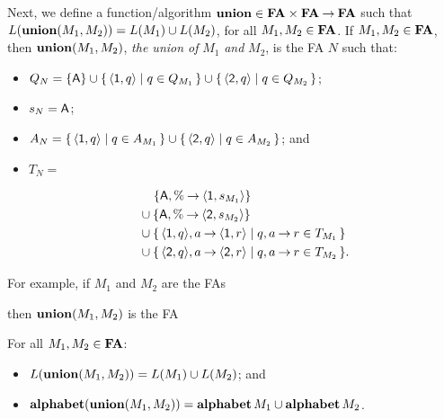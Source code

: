%
%
%
Next, we define a function/algorithm $\mathbf{union}\in\mathbf{FA}\times\mathbf{FA}\mathbin{\to}\mathbf{FA}$
such that $L(\mathbf{union}(M_1,M_2))=L(M_1)\cup L(M_2)$, for all
$M_1,M_2\in\mathbf{FA}$.  If $M_1,M_2\in\mathbf{FA}$, then $\mathbf{union}(M_1,M_2)$,
\emph{the union of} $M_1$ \emph{and} $M_2$, is the FA $N$ such that:
\begin{itemize}
\item $Q_N= \{\mathsf{A}\}\cup\{ \, \langle\mathsf{1},q\rangle \mid q\in
    Q_{M_1} \, \}\cup \{ \, \langle\mathsf{2},q\rangle \mid q\in Q_{M_2} \, \}$;

\item $s_N=\mathsf{A}$;

\item $A_N=\{ \, \langle\mathsf{1},q\rangle \mid q\in A_{M_1} \, \}\cup
  \{ \, \langle\mathsf{2},q\rangle \mid q\in A_{M_2} \, \}$; and

\item $T_N={}$

\begin{align*}
  &\quad
  \,\{\mathsf{A},\%\mathbin{\to} \langle\mathsf{1},s_{M_1}\rangle\} \\
  &\cup \{\mathsf{A},\%\mathbin{\to}\langle\mathsf{2},s_{M_2}\rangle\} \\
  &\cup \{ \, \langle\mathsf{1},q\rangle,a\mathbin{\to}\langle\mathsf{1},r\rangle \mid q,
    a\mathbin{\to} r\in T_{M_1} \, \}
  \\
  &\cup \{ \, \langle\mathsf{2},q\rangle,a\mathbin{\to}\langle\mathsf{2},r\rangle \mid q,
    a\mathbin{\to} r \in T_{M_2} \, \}.
\end{align*}
\end{itemize}

For example, if $M_1$ and $M_2$ are the FAs
\begin{center}


\end{center}
then $\mathbf{union}(M_1,M_2)$ is the FA
\begin{center}

\end{center}

\begin{proposition}
For all $M_1,M_2\in\mathbf{FA}$:
\begin{itemize}
\item $L(\mathbf{union}(M_1,M_2))=L(M_1)\cup L(M_2)$; and

\item $\mathbf{alphabet}(\mathbf{union}(M_1,M_2))=\mathbf{alphabet}\,M_1\cup\mathbf{alphabet}\,M_2$.
\end{itemize}
\end{proposition}

